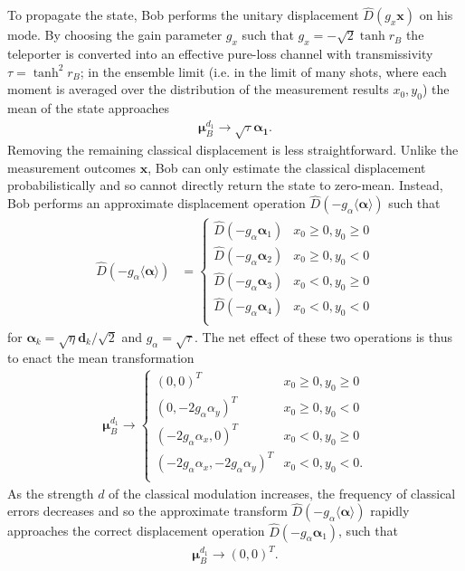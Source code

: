 \documentclass[%
 reprint,
 superscriptaddress,
 amsmath,
 amssymb,
 aps,
 pra,
]{revtex4-2}
\begin{document}
To propagate the state, Bob performs the unitary displacement $\hat D(g_x \bm{x})$ on his mode. By choosing the gain parameter $g_x$ such that $g_x = -\sqrt{2}\tanh r_B$ the teleporter is converted into an effective pure-loss channel \cite{ralph_continuous_1999} with transmissivity $\tau = \tanh^2r_B$; in the ensemble limit (i.e. in the limit of many shots, where each moment is averaged over the distribution of the measurement results $x_0, y_0$) the mean of the state approaches 
\begin{align}
    \bm{\mu}_B^{d_1} \longrightarrow \sqrt{\tau} \bm{\alpha_1}.
\end{align}
Removing the remaining classical displacement is less straightforward. Unlike the measurement outcomes $\bm{x}$, Bob can only estimate the classical displacement probabilistically and so cannot directly return the state to zero-mean. Instead, Bob performs an approximate displacement operation $\hat D(-g_\alpha\langle \bm{\alpha} \rangle)$ such that
\begin{align}
    \hat D(-g_\alpha\langle \bm{\alpha} \rangle) &= \begin{cases}
        \hat D(-g_\alpha \bm{\alpha}_1) & x_0 \geq 0, y_0 \geq 0 \\
        \hat D(-g_\alpha \bm{\alpha}_2) & x_0 \geq 0, y_0 < 0 \\
        \hat D(-g_\alpha \bm{\alpha}_3) & x_0 < 0, y_0 \geq 0 \\
        \hat D(-g_\alpha \bm{\alpha}_4) & x_0 < 0, y_0 < 0 \\
    \end{cases}
\end{align}
for $\bm{\alpha}_k = \sqrt{\eta}\bm{d}_k/\sqrt{2}$ and $g_\alpha = \sqrt{\tau}$. The net effect of these two operations is thus to enact the mean transformation
\begin{align}
    \bm{\mu}_{B}^{d_1} \rightarrow \begin{cases}
        (0, 0)^T & x_0 \geq 0, y_0 \geq 0 \\
        (0, -2g_\alpha \alpha_y)^T & x_0 \geq 0, y_0 < 0 \\
        (-2g_\alpha \alpha_x, 0)^T & x_0 < 0, y_0 \geq 0 \\
        (-2g_\alpha \alpha_x, -2g_\alpha \alpha_y)^T & x_0 < 0, y_0 < 0. \\
    \end{cases}
\end{align}
As the strength $d$ of the classical modulation increases, the frequency of classical errors decreases and so the approximate transform $\hat D(-g_\alpha\langle \bm{\alpha} \rangle)$ rapidly approaches the correct displacement operation $\hat D(-g_\alpha \bm{ \alpha}_1 )$, such that
\begin{align}
    \bm{\mu}_{B}^{d_1} \longrightarrow (0,0)^T.
\end{align}
\end{document}
